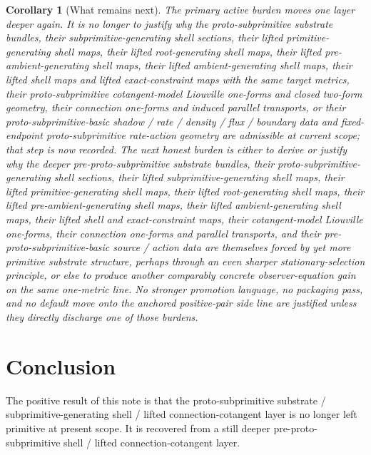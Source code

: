 \documentclass[11pt]{article}
\newtheorem{corollary}{Corollary}
\begin{document}
\begin{corollary}[What remains next]
\label{cor:what_next}
The primary active burden moves one layer deeper again. It is no longer to justify why the proto-subprimitive substrate bundles, their subprimitive-generating shell sections, their lifted primitive-generating shell maps, their lifted root-generating shell maps, their lifted pre-ambient-generating shell maps, their lifted ambient-generating shell maps, their lifted shell maps and lifted exact-constraint maps with the same target metrics, their proto-subprimitive cotangent-model Liouville one-forms and closed two-form geometry, their connection one-forms and induced parallel transports, or their proto-subprimitive-basic shadow / rate / density / flux / boundary data and fixed-endpoint proto-subprimitive rate-action geometry are admissible at current scope; that step is now recorded. The next honest burden is either to derive or justify why the deeper pre-proto-subprimitive substrate bundles, their proto-subprimitive-generating shell sections, their lifted subprimitive-generating shell maps, their lifted primitive-generating shell maps, their lifted root-generating shell maps, their lifted pre-ambient-generating shell maps, their lifted ambient-generating shell maps, their lifted shell and exact-constraint maps, their cotangent-model Liouville one-forms, their connection one-forms and parallel transports, and their pre-proto-subprimitive-basic source / action data are themselves forced by yet more primitive substrate structure, perhaps through an even sharper stationary-selection principle, or else to produce another comparably concrete observer-equation gain on the same one-metric line. No stronger promotion language, no packaging pass, and no default move onto the anchored positive-pair side line are justified unless they directly discharge one of those burdens.
\end{corollary}

\section{Conclusion}

The positive result of this note is that the proto-subprimitive substrate / subprimitive-generating shell / lifted connection-cotangent layer is no longer left primitive at present scope. It is recovered from a still deeper pre-proto-subprimitive shell / lifted connection-cotangent layer.
\end{document}

